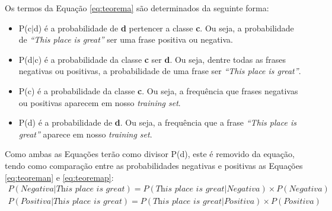 Os termos da Equação \ref{eq:teorema} são determinados da seguinte forma:
\begin{itemize}
  \item P(c$\vert$d) é a probabilidade de \textbf{d} pertencer a classe
  \textbf{c}. Ou seja, a probabilidade de \textit{``This place is great''} ser
  uma frase positiva ou negativa.
  \item P(d$\vert$c) é a probabilidade da classe \textbf{c} ser \textbf{d}. Ou
  seja, dentre todas as frases negativas ou positivas, a probabilidade de
  uma frase ser \textit{``This place is great''}.
  \item P(c) é a probabilidade da classe \textbf{c}. Ou seja, a frequência que
  frases negativas ou positivas aparecem em nosso \textit{training
  set}.
  \item P(d) é a probabilidade de \textbf{d}. Ou seja, a frequência que
  a frase \textit{``This place is great''} aparece em nosso \textit{training
  set}.
\end{itemize}

Como ambas as Equações terão como divisor P(d), este é removido da equação, tendo como
comparação entre as probabilidades negativas e positivas as Equações
\ref{eq:teoreman} e \ref{eq:teoremap}:
\begin{equation}
\begin{gathered}
P(Negativa|\textit{This place is great})
=
P(\textit{This place is great}|Negativa) \times
P(Negativa)
\label{eq:teoreman}
\end{gathered}
\end{equation}
\begin{equation}
\begin{gathered}
P(Positiva|\textit{This place is great})
=
P(\textit{This place is great}|Positiva) \times
P(Positiva)
\label{eq:teoremap}
\end{gathered}
\end{equation}

